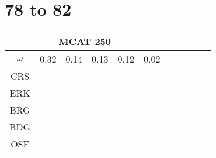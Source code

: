 \documentclass[a4paper,12pt]{article}
\begin{document}
\centering
\section*{78 to 82}
\begin{tabular}{|c|c|c|c|c|c|c|c|c|c|c|}
        \hline \multicolumn{6}{|c|}{MCAT 250} \\ \hline
	$\omega$&0.32&0.14&0.13&0.12&0.02 \\ \hline %
	CRS&\cellcolor[HTML]{E41A1C}&\cellcolor[HTML]{E41A1C}&\cellcolor[HTML]{E41A1C}&\cellcolor[HTML]{E41A1C}&\cellcolor[HTML]{E41A1C}\\ \hline %
        ERK&\cellcolor[HTML]{377EB8}&\cellcolor[HTML]{377EB8}&\cellcolor[HTML]{377EB8}&\cellcolor[HTML]{377EB8}&\cellcolor[HTML]{377EB8}\\ \hline %
        BRG&\cellcolor[HTML]{4DAF4A}&\cellcolor[HTML]{4DAF4A}&\cellcolor[HTML]{4DAF4A}&\cellcolor[HTML]{4DAF4A}&\cellcolor[HTML]{4DAF4A}\\ \hline %
        BDG&\cellcolor[HTML]{4DAF4A}&\cellcolor[HTML]{4DAF4A}&\cellcolor[HTML]{4DAF4A}&\cellcolor[HTML]{4DAF4A}&\cellcolor[HTML]{4DAF4A}\\ \hline %
        OSF&\cellcolor[HTML]{984EA3}&\cellcolor[HTML]{984EA3}&\cellcolor[HTML]{984EA3}&\cellcolor[HTML]{984EA3}&\cellcolor[HTML]{4DAF4A}\\ \hline %

\end{tabular}
\end{document}
